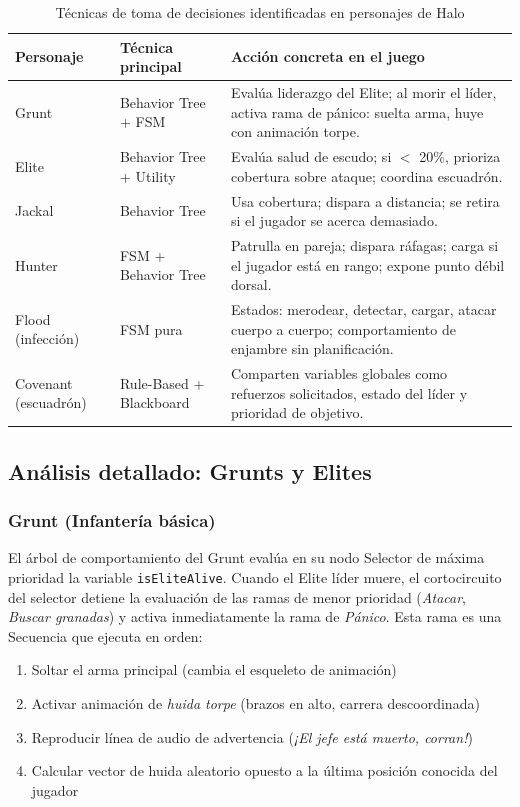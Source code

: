 \documentclass[12pt,letterpaper]{article}
\begin{document}
\begin{table}[H]
\centering
\caption{Técnicas de toma de decisiones identificadas en personajes de Halo}
\small
\begin{tabularx}{\textwidth}{L{2.2cm}L{2.8cm}Y}
\toprule
\textbf{Personaje} & \textbf{Técnica principal} & \textbf{Acción concreta en el juego} \\
\midrule
Grunt & Behavior Tree + FSM & Evalúa liderazgo del Elite; al morir el líder, activa rama de pánico: suelta arma, huye con animación torpe. \\
Elite & Behavior Tree + Utility & Evalúa salud de escudo; si $<$ 20\%, prioriza cobertura sobre ataque; coordina escuadrón. \\
Jackal & Behavior Tree & Usa cobertura; dispara a distancia; se retira si el jugador se acerca demasiado. \\
Hunter & FSM + Behavior Tree & Patrulla en pareja; dispara ráfagas; carga si el jugador está en rango; expone punto débil dorsal. \\
Flood (infección) & FSM pura & Estados: merodear, detectar, cargar, atacar cuerpo a cuerpo; comportamiento de enjambre sin planificación. \\
Covenant (escuadrón) & Rule-Based + Blackboard & Comparten variables globales como refuerzos solicitados, estado del líder y prioridad de objetivo. \\
\bottomrule
\end{tabularx}
\end{table}

\subsection{Análisis detallado: Grunts y Elites}

\subsubsection{Grunt (Infantería básica)}

El árbol de comportamiento del Grunt evalúa en su nodo Selector de máxima prioridad la variable \texttt{isEliteAlive}. Cuando el Elite líder muere, el cortocircuito del selector detiene la evaluación de las ramas de menor prioridad (\textit{Atacar}, \textit{Buscar granadas}) y activa inmediatamente la rama de \textit{Pánico}. Esta rama es una Secuencia que ejecuta en orden:

\begin{enumerate}[nosep]
  \item Soltar el arma principal (cambia el esqueleto de animación)
  \item Activar animación de \textit{huida torpe} (brazos en alto, carrera descoordinada)
  \item Reproducir línea de audio de advertencia (\textit{¡El jefe está muerto, corran!})
  \item Calcular vector de huida aleatorio opuesto a la última posición conocida del jugador
\end{enumerate}
\end{document}
